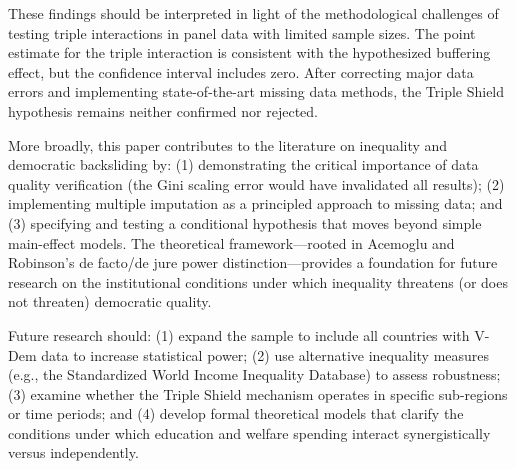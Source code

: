 \documentclass[11pt,letterpaper]{article}
\begin{document}
These findings should be interpreted in light of the methodological challenges of testing triple interactions in panel data with limited sample sizes. The point estimate for the triple interaction is consistent with the hypothesized buffering effect, but the confidence interval includes zero. After correcting major data errors and implementing state-of-the-art missing data methods, the Triple Shield hypothesis remains neither confirmed nor rejected.

More broadly, this paper contributes to the literature on inequality and democratic backsliding by: (1) demonstrating the critical importance of data quality verification (the Gini scaling error would have invalidated all results); (2) implementing multiple imputation as a principled approach to missing data; and (3) specifying and testing a conditional hypothesis that moves beyond simple main-effect models. The theoretical framework---rooted in Acemoglu and Robinson's de facto/de jure power distinction---provides a foundation for future research on the institutional conditions under which inequality threatens (or does not threaten) democratic quality.

Future research should: (1) expand the sample to include all countries with V-Dem data to increase statistical power; (2) use alternative inequality measures (e.g., the Standardized World Income Inequality Database) to assess robustness; (3) examine whether the Triple Shield mechanism operates in specific sub-regions or time periods; and (4) develop formal theoretical models that clarify the conditions under which education and welfare spending interact synergistically versus independently.



\end{document}
